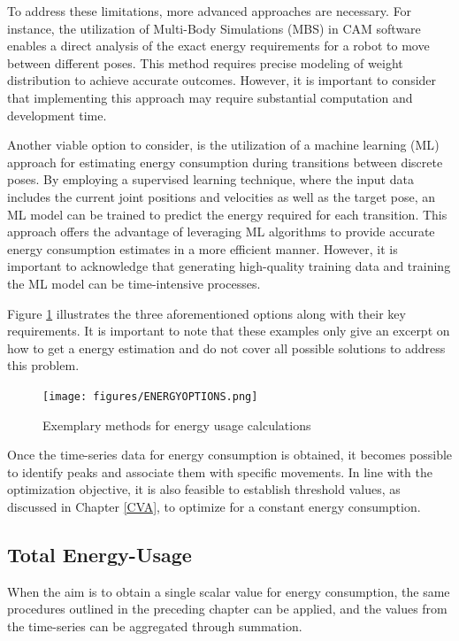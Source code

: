 To address these limitations, more advanced approaches are necessary. For instance, the utilization of Multi-Body Simulations (\acrshort{MBS}) in \acrshort{CAM} software enables a direct analysis of the exact energy requirements for a robot to move between different poses. This method requires precise modeling of weight distribution to achieve accurate outcomes. However, it is important to consider that implementing this approach may require substantial computation and development time.


Another viable option to consider, is the utilization of a machine learning (\acrshort{ML}) approach for estimating energy consumption during transitions between discrete poses. By employing a supervised learning technique, where the input data includes the current joint positions and velocities as well as the target pose, an \acrshort{ML} model can be trained to predict the energy required for each transition. This approach offers the advantage of leveraging \acrshort{ML} algorithms to provide accurate energy consumption estimates in a more efficient manner. However, it is important to acknowledge that generating high-quality training data and training the \acrshort{ML} model can be time-intensive processes.

Figure \ref{ENERGYOPTIONS} illustrates the three aforementioned options along with their key requirements. It is important to note that these examples only give an excerpt on how to get a energy estimation and do not cover all possible solutions to address this problem. 

\begin{figure}[H]
	\centerline{\texttt{[image: figures/ENERGYOPTIONS.png]}}
	\caption{Exemplary methods for energy usage calculations}
	\label{ENERGYOPTIONS}
\end{figure}

Once the time-series data for energy consumption is obtained, it becomes possible to identify peaks and associate them with specific movements. In line with the optimization objective, it is also feasible to establish threshold values, as discussed in Chapter \ref{CVA}, to optimize for a constant energy consumption.

\newpage
\subsection{Total Energy-Usage}
When the aim is to obtain a single scalar value for energy consumption, the same procedures outlined in the preceding chapter can be applied, and the values from the time-series can be aggregated through summation.

